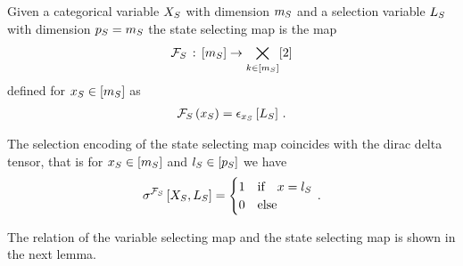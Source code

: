 \begin{definition}
    \label{def:stateSelector}
    Given a categorical variable $X_{S}$ with dimension $m_{S}$ and a selection variable $L_{S}$ with dimension $p_{S}=m_{S}$ the state selecting map is the map
    \begin{align*}
        \mathcal{F}_{S}\,:\,[m_{S}] \rightarrow \bigtimes_{k\in[m_{S}]} [2]
    \end{align*}
    defined for $x_{S}\in[m_{S}]$ as
    \begin{align*}
        \mathcal{F}_{S}\left(x_{S}\right) = \epsilon_{x_{S}}\left[L_{S}\right] \, .
    \end{align*}
\end{definition}

The selection encoding of the state selecting map coincides with the dirac delta tensor, that is for $x_{S}\in[m_{S}]$ and $l_{S}\in[p_{S}]$ we have
\begin{align*}
    \sigma^{\mathcal{F}_{S}}\left[X_{S},L_{S}\right] =
    \begin{cases}
        1 & \text{if}\quad x = l_{S} \\
        0 & \text{else}
    \end{cases} \, .
\end{align*}

The relation of the variable selecting map and the state selecting map is shown in the next lemma.

